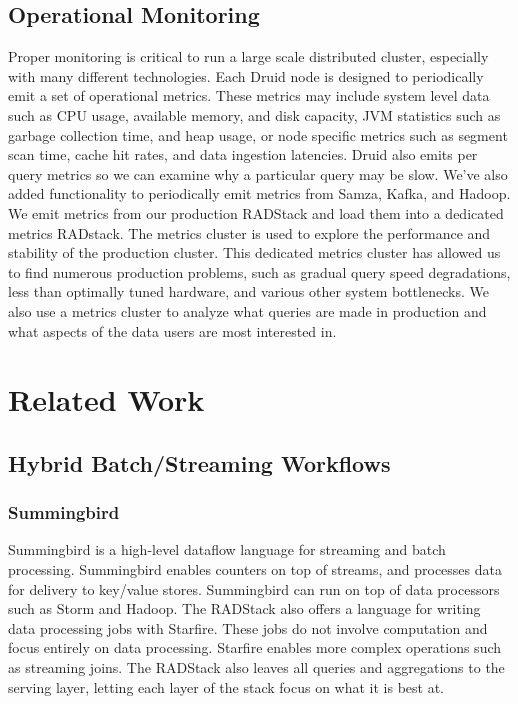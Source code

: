 \documentclass{vldb}
\begin{document}
\subsection{Operational Monitoring}
Proper monitoring is critical to run a large scale distributed cluster,
especially with many different technologies. Each Druid node is designed to
periodically emit a set of operational metrics. These metrics may include
system level data such as CPU usage, available memory, and disk capacity, JVM
statistics such as garbage collection time, and heap usage, or node specific
metrics such as segment scan time, cache hit rates, and data ingestion
latencies. Druid also emits per query metrics so we can examine why a
particular query may be slow. We’ve also added functionality to periodically
emit metrics from Samza, Kafka, and Hadoop. We emit metrics from our production
RADStack and load them into a dedicated metrics RADstack. The metrics cluster
is used to explore the performance and stability of the production cluster.
This dedicated metrics cluster has allowed us to find numerous production
problems, such as gradual query speed degradations, less than optimally tuned
hardware, and various other system bottlenecks. We also use a metrics cluster
to analyze what queries are made in production and what aspects of the data
users are most interested in.

\section{Related Work}
\label{sec:related}

\subsection{Hybrid Batch/Streaming Workflows}

\subsubsection{Summingbird}
Summingbird\cite{boykin2014summingbird} is a high-level dataflow language for
streaming and batch processing. Summingbird enables counters on top of streams,
and processes data for delivery to key/value stores. Summingbird can run on top
of data processors such as Storm\cite{marz2013storm} and Hadoop. The RADStack
also offers a language for writing data processing jobs with Starfire. These
jobs do not involve computation and focus entirely on data processing. Starfire
enables more complex operations such as streaming joins. The RADStack also 
leaves all queries and aggregations to the serving layer, letting each layer of
the stack focus on what it is best at.
\end{document}
